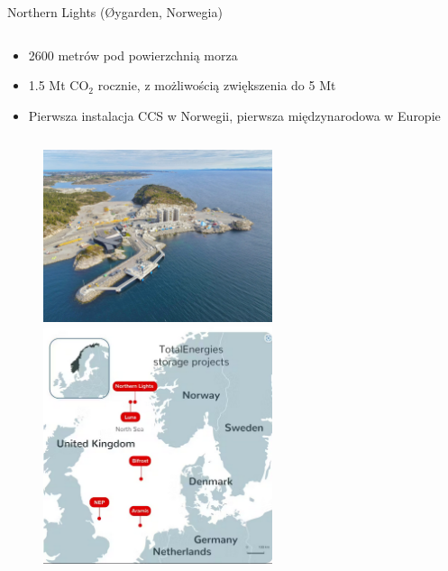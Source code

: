 \begin{columnframe}{Northern Lights (Øygarden, Norwegia)}
    \begin{column}{0.5\textwidth}
        \begin{itemize}
            \item 2600 metrów pod powierzchnią morza
            \item 1.5 Mt CO$_2$ rocznie, z możliwością zwiększenia do 5 Mt
            \item Pierwsza instalacja CCS w Norwegii, pierwsza międzynarodowa w Europie
        \end{itemize}
    \end{column}
    \begin{column}{0.5\textwidth}
        \begin{figure}
            \centering
            \includegraphics[width=0.6\textwidth, frame]{images/northern_lights.jpeg}
            \includegraphics[width=0.6\textwidth, frame]{images/northern_lights_map.png}
        \end{figure}
    \end{column}
\end{columnframe}

